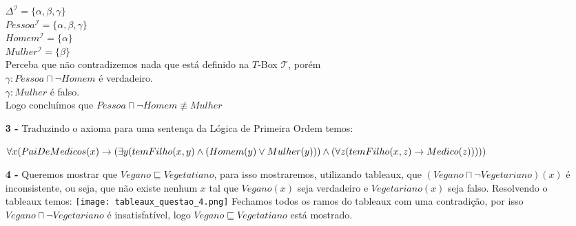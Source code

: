\documentclass[12pt]{article}
\begin{document}
\begin{itemize}
			$\Delta^\mathcal{I} = \lbrace \alpha, \beta, \gamma \rbrace$\\
			$Pessoa^\mathcal{I} = \lbrace \alpha, \beta, \gamma \rbrace$\\
			$Homem^\mathcal{I} = \lbrace \alpha \rbrace$\\
			$Mulher^\mathcal{I} = \lbrace \beta \rbrace$\\
			
			Perceba que não contradizemos nada que está definido na $T$-Box $\mathcal{T}$,
			porém\\
			$\gamma: Pessoa \sqcap \neg Homem$ é verdadeiro.\\
			$\gamma: Mulher$ é falso.\\
			Logo concluímos que $Pessoa \sqcap \neg Homem \not\equiv Mulher$
			
		\item[\textbf{3 -}]
			\hfill\newline
			Traduzindo o axioma para uma sentença da Lógica de Primeira Ordem temos:\\
			
			\begin{footnotesize}
			$\forall x( PaiDeMedicos(x) \rightarrow \\ (\exists y(temFilho(x, y) \wedge (Homem(y) \vee Mulher(y))) \wedge (\forall z (temFilho(x, z) \rightarrow Medico(z)))))$
			\end{footnotesize}			
		\item[\textbf{4 -}]
			\hfill\newline
			Queremos mostrar que $Vegano \sqsubseteq Vegetatiano$, para isso mostraremos,
			utilizando tableaux, que $(Vegano \sqcap \neg Vegetariano)(x)$ é inconsistente, ou
			seja, que não existe nenhum $x$ tal que $Vegano(x)$ seja verdadeiro e $Vegetariano(x)$
			seja falso.
			\newpage
			Resolvendo o tableaux temos:
			\hfill\newline	\hfill\newline			
			\texttt{[image: tableaux\_questao\_4.png]}
			\hfill\newline			
			Fechamos todos os ramos do tableaux com uma contradição, por isso
			$Vegano \sqcap \neg Vegetariano$ é insatisfatível, logo $Vegano \sqsubseteq Vegetatiano$ 
			está mostrado.
	\end{itemize}
\end{document}
